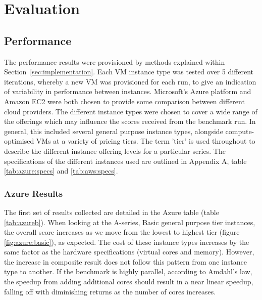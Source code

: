 \documentclass{llncs}
\begin{document}

\section{Evaluation}

\subsection{Performance}\label{sec:eval:performance}

The performance results were provisioned by methods explained within Section~\ref{sec:implementation}. Each VM instance type was tested over 5 different iterations, whereby a new VM was provisioned for each run, to give an indication of variability in performance between instances. Microsoft's Azure platform and Amazon EC2 were both chosen to provide some comparison between different cloud providers. The different instance types were chosen to cover a wide range of the offerings which may influence the scores received from the benchmark run. In general, this included several general purpose instance types, alongside compute-optimised VMs at a variety of pricing tiers. The term 'tier' is used throughout to describe the different instance offering levels for a particular series. The specifications of the different instances used are outlined in Appendix A, table \ref{tab:azure:specs} and \ref{tab:aws:specs}.

\subsubsection{Azure Results}\label{sec:eval:azureresults}

The first set of results collected are detailed in the Azure table (table \ref{tab:azureb}). When looking at the A-series, Basic general purpose tier instances, the overall score increases as we move from the lowest to highest tier (figure \ref{fig:azure:basic}), as expected. The cost of these instance types increases by the same factor as the hardware specifications (virtual cores and memory). However, the increase in composite result does not follow this pattern from one instance type to another. If the benchmark is highly parallel, according to Amdahl's law, the speedup from adding additional cores should result in a near linear speedup, falling off with diminishing returns as the number of cores increases.
\end{document}
